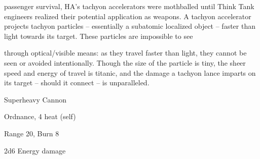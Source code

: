 passenger survival, HA's tachyon accelerators were mothballed until Think Tank engineers realized their
potential application as weapons. A tachyon accelerator projects tachyon particles -- essentially a
subatomic localized object -- faster than light towards its target. These particles are impossible to see

through optical/visible means: as they travel faster than light, they cannot be seen or avoided intentionally.
Though the size of the particle is tiny, the sheer speed and energy of travel is titanic, and the damage a
tachyon lance imparts on its target -- should it connect -- is unparalleled.

Superheavy Cannon

Ordnance, 4 heat (self)

Range 20, Burn 8

2d6 Energy damage


